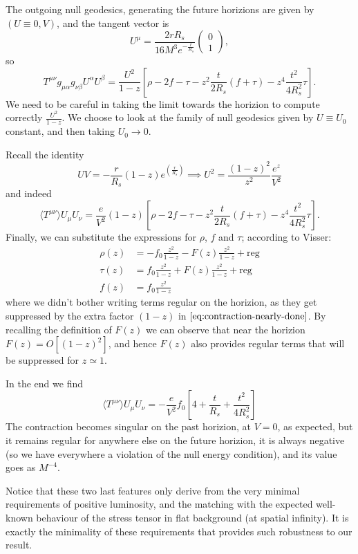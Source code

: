 The outgoing null geodesics, generating the future horizions are given by \((U \equiv 0, V)\), and the tangent vector is 
\[
U^{\mu} = \frac{2rR_s}{16M^3e^{-\frac{r}{R_s}}} \begin{pmatrix}
    0 \\ 1
\end{pmatrix},
\]
so
\[
   T^{\mu\nu}g_{\mu\alpha}g_{\nu\beta}U^{\alpha}U^{\beta}  = 
    \frac{U^2}{1 - z}\left[\rho - 2f - \tau - z^2 \frac{t}{2R_s} \left(f + \tau\right) - z^4\frac{t^2}{4R_s^2}\tau \right].
\]
We need to be careful in taking the limit towards the horizion to compute correctly \(\frac{U^2}{1 - z}\). We choose to look at the family of null geodesics given by \(U \equiv U_0\) constant, and then taking \(U_0 \rightarrow 0\). 

Recall the identity
\[
UV = - \frac{r}{R_s} (1 - z) e^(\frac{r}{R_s}) \implies U^2 = \frac{(1 - z)^2}{z^2}  \frac{e^z}{V^2}
\]
and indeed
\begin{equation}
    \label{eq:contraction-nearly-done}
    \langle T^{\mu\nu}\rangle U_{\mu}U_{\nu} = \frac{e}{V^2}(1 - z)\left[\rho - 2f - \tau - z^2 \frac{t}{2R_s} \left(f + \tau\right) - z^4\frac{t^2}{4R_s^2}\tau \right]. 
\end{equation}
Finally, we can substitute the expressions for \(\rho\), \(f\) and \(\tau\); according to Visser:
\begin{align*}
    \rho(z) &= -f_0 \frac{z^2}{1 - z} - F(z) \frac{z^2}{1 - z} + \text{reg} \\
    \tau(z) &= f_0 \frac{z^2}{1 - z} + F(z) \frac{z^2}{1 - z} + \text{reg} \\
    f(z) &= f_0 \frac{z^2}{1 - z}
\end{align*}
where we didn't bother writing terms regular on the horizion, as they get suppressed by the extra factor \((1 - z)\) in \(\eqref{eq:contraction-nearly-done}\). By recalling the definition of \(F(z)\) we can observe that near the horizion \(F(z) = O[(1 - z)^2]\), and hence \(F(z)\) also provides regular terms that will be suppressed for \(z \simeq 1\).

In the end we find
\[
    \langle T^{\mu\nu}\rangle U_{\mu}U_{\nu} =  -\frac{e}{V^2}f_0 \left[4 + \frac{t}{R_s} + \frac{t^2}{4R_s^2}\right]
\]
The contraction becomes singular on the past horizion, at \(V = 0\), as expected, but it remains regular for anywhere else on the future horizion, it is always negative (so we have everywhere a violation of the null energy condition), and its value goes as \(M^{-4}\). 

Notice that these two last features only derive from the very minimal requirements of positive luminosity, and the matching with the expected well-known behaviour of the stress tensor in flat background (at spatial infinity). It is exactly the minimality of these requirements that provides such robustness to our result.


